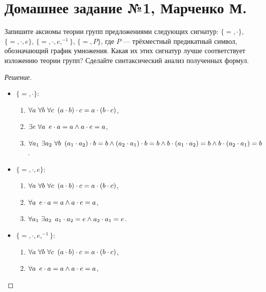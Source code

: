 


    \section*{Домашнее задание №1, Марченко М.}

    \begin{problem}[1]
        Запишите аксиомы теории групп предложениями следующих сигнатур: \(\{=, \cdot \}\), \(\{=, \cdot, e \}\), \(\{=, \cdot, e, ^{-1} \}\), \(\{=, P \}\), где \(P\) --- трёхместный предикатный символ, обозначающий график умножения. Какая их этих сигнатур лучше соответствует изложению теории групп? Сделайте синтаксический анализ полученных формул.
    \end{problem}
    \begin{proof}[Решение]
        \begin{itemize}
            \item \(\{=, \cdot \}\):
            \begin{enumerate}
                \item \(\forall a \ \forall b \ \forall c \enskip (a \cdot b) \cdot c = a \cdot (b \cdot c)\),
                \item \(\exists e \ \forall a \enskip e \cdot a = a \land a \cdot e = a\),
                \item \(\forall a_1 \ \exists a_2 \ \forall b \enskip (a_1 \cdot a_2) \cdot b = b \land (a_2 \cdot a_1) \cdot b = b \land b \cdot (a_1 \cdot a_2) = b \land b \cdot (a_2 \cdot a_1) = b\).
            \end{enumerate}
            \item \(\{=, \cdot, e\}\):
            \begin{enumerate}
                \item \(\forall a \ \forall b \ \forall c \enskip (a \cdot b) \cdot c = a \cdot (b \cdot c)\),
                \item \(\forall a \enskip e \cdot a = a \land a \cdot e = a\),
                \item \(\forall a_1 \ \exists a_2 \enskip a_1 \cdot a_2 = e \land a_2 \cdot a_1 = e\).
            \end{enumerate}
            \item \(\{=, \cdot, e, ^{-1}\}\):
            \begin{enumerate}
                \item \(\forall a \ \forall b \ \forall c \enskip (a \cdot b) \cdot c = a \cdot (b \cdot c)\),
                \item \(\forall a \enskip e \cdot a = a \land a \cdot e = a\),

\end{enumerate}
\end{itemize}
\end{proof}
